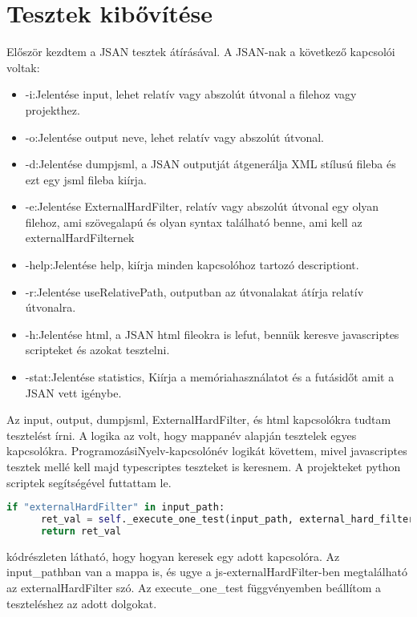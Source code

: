 \section{Tesztek kibővítése}

\noindent

Először kezdtem a JSAN tesztek átírásával. A JSAN-nak a következő kapcsolói voltak:
\begin{itemize}
      \item -i:Jelentése input, lehet relatív vagy abszolút útvonal a filehoz vagy projekthez.
      \item -o:Jelentése output neve, lehet relatív vagy abszolút útvonal.
      \item -d:Jelentése dumpjsml, a JSAN outputját átgenerálja XML stílusú fileba és ezt egy jsml fileba kiírja.
      \item -e:Jelentése ExternalHardFilter, relatív vagy abszolút útvonal egy olyan filehoz, ami szövegalapú és olyan syntax található benne, ami kell az externalHardFilternek
      \item -help:Jelentése help, kiírja minden kapcsolóhoz tartozó descriptiont.
      \item -r:Jelentése useRelativePath, outputban az útvonalakat átírja relatív útvonalra.
      \item -h:Jelentése html, a JSAN html fileokra is lefut, bennük keresve javascriptes scripteket és azokat tesztelni.
      \item -stat:Jelentése statistics, Kiírja a memóriahasználatot és a futásidőt amit a JSAN vett igénybe.
\end{itemize}

\noindent

Az input, output, dumpjsml, ExternalHardFilter, és html kapcsolókra tudtam tesztelést írni. A logika az volt, hogy mappanév alapján tesztelek egyes kapcsolókra.
ProgramozásiNyelv-kapcsolónév logikát követtem, mivel javascriptes tesztek mellé kell majd typescriptes teszteket is keresnem.
A projekteket python scriptek segítségével futtattam le.

\begin{lstlisting}[caption={JSAN kapcsoló vizsgálat pythonban}, label={lst:python_kapcsolo}, language={Python}]
if "externalHardFilter" in input_path:
      ret_val = self._execute_one_test(input_path, external_hard_filter=True) and ret_val
      return ret_val
\end{lstlisting}

 kódrészleten látható, hogy hogyan keresek egy adott kapcsolóra. Az input\_pathban van a mappa is, és ugye a js-externalHardFilter-ben megtalálható az externalHardFilter szó.
Az execute\_one\_test függvényemben beállítom a teszteléshez az adott dolgokat.

